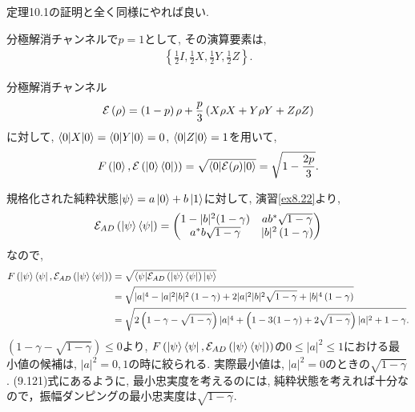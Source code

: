 \begin{ex}
    \label{ex10.10}
    定理10.1の証明と全く同様にやれば良い.
\end{ex}

\begin{ex}
    \label{ex10.11}
    分極解消チャンネルで$p=1$として, その演算要素は,
    \begin{align*}
        \left\{ \frac{1}{2} I, \frac{1}{2}X, \frac{1}{2}Y, \frac{1}{2}Z\right\}.
    \end{align*}
\end{ex}

\begin{ex}
    \label{ex10.12}
    分極解消チャンネル
    \begin{align*}
        \mathcal{E}\left( \rho\right) =
        \left(1-p\right) \rho
        +
        \frac{p}{3}
        \left(
        X \rho X + Y \rho Y + Z \rho Z
        \right)
    \end{align*}
    に対して, $\braket{0|X|0} = \braket{0|Y|0} = 0$, $\braket{0|Z|0} = 1$を用いて,
    \begin{align*}
        F\left( \ket{0}, \mathcal{E}\left( \ket{0}\bra{0}\right)\right)
        =
        \sqrt{\braket{0 | \mathcal{E}(\rho)|0}}
        =
        \sqrt{1 - \frac{2p}{3}}.
    \end{align*}
\end{ex}

\begin{ex}
    \label{ex10.13}
    規格化された純粋状態$\ket{\psi} = a \ket{0} + b \ket{1}$に対して, 演習\ref{ex8.22}より,
    \begin{align*}
        \mathcal{E}_{AD}\left( \ket{\psi}\bra{\psi} \right)
        =
        \begin{pmatrix}
            1- |b|^2(1 - \gamma) & ab^* \sqrt{1-\gamma}       \\
            a^*b\sqrt{1- \gamma} & |b|^2\left(1-\gamma\right)
        \end{pmatrix}
    \end{align*}
    なので,
    \begin{align*}
        F \left( \ket{\psi}\bra{\psi},  \mathcal{E}_{AD}\left( \ket{\psi}\bra{\psi} \right)\right)
         & =
        \sqrt{\braket{\psi| \mathcal{E}_{AD}\left( \ket{\psi}\bra{\psi} \right) | \psi}}                                             \\
         & =
        \sqrt{
            |a|^4 - |a|^2 |b|^2 \left( 1 - \gamma\right) + 2 |a|^2 |b|^2 \sqrt{1 - \gamma} + |b|^4 \left( 1 - \gamma\right)} \\
         & =
        \sqrt{
            2\left( 1 - \gamma - \sqrt{1 - \gamma} \right) |a|^4 + \left( 1 - 3 (1 - \gamma) + 2 \sqrt{1 - \gamma}\right) |a|^2 + 1 - \gamma}.
    \end{align*}
    $\left( 1 - \gamma - \sqrt{1 - \gamma} \right) \leq 0$より, $F \left( \ket{\psi}\bra{\psi},  \mathcal{E}_{AD}\left( \ket{\psi}\bra{\psi} \right)\right)$の$0 \leq |a|^2 \leq 1$における最小値の候補は, $|a|^2 = 0, 1$の時に絞られる. 実際最小値は, $|a|^2 = 0$のときの$\sqrt{1 - \gamma}$. (9.121)式にあるように, 最小忠実度を考えるのには, 純粋状態を考えれば十分なので，振幅ダンピングの最小忠実度は$\sqrt{1-\gamma}$.
\end{ex}

